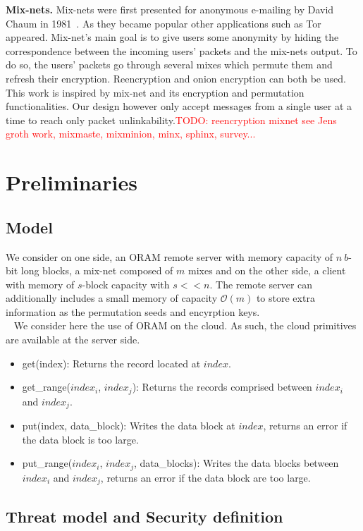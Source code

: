 \documentclass{llncs}
\newcommand{\todo}[1]{\textcolor{red}{TODO: #1}}
\begin{document}
\noindent\textbf{Mix-nets.}
Mix-nets were first presented for anonymous e-mailing by David Chaum in 1981~\cite{xxx}. As they became popular other applications such as Tor~\cite{dingledine2004tor} appeared. Mix-net's main goal is to give users some anonymity by hiding the correspondence between the incoming users' packets and the mix-nets output. To do so, the users' packets go through several mixes which permute them and refresh their encryption. Reencryption and onion encryption can both be used.
This work is inspired by mix-net and its encryption and permutation functionalities. Our design however only accept messages from a single user at a time to reach only packet unlinkability.\todo{reencryption mixnet see Jens groth work, mixmaste, mixminion, minx, sphinx, survey...}
%
\section{Preliminaries}\label{Prelim}
%
\subsection{Model}\label{Model}
We consider on one side, an ORAM remote server with memory capacity of $n\ b$-bit long blocks, a mix-net composed of $m$ mixes and on the other side, a client with memory of $s$-block capacity with $s<<n$. The remote server can additionally includes a small memory of capacity $\mathcal{O}(m)$ to store extra information as the permutation seeds and encyrption keys.\\\
%
We consider here the use of ORAM on the cloud. As such, the cloud primitives are available at the server side. 
\begin{itemize}
 \item get(index): Returns the record located at $index$.
 \item get\_range($index_i$, $index_j$): Returns the records comprised between $index_i$ and $index_j$.
 \item put(index, data\_block):  Writes the data block at $index$, returns an error if the data block is too large.
 \item put\_range($index_i$, $index_j$, data\_blocks): Writes the data blocks between $index_i$ and $index_j$, returns an error if the data block are too large.
\end{itemize}

%
\subsection{Threat model and Security definition}\label{Threat}
\end{document}
